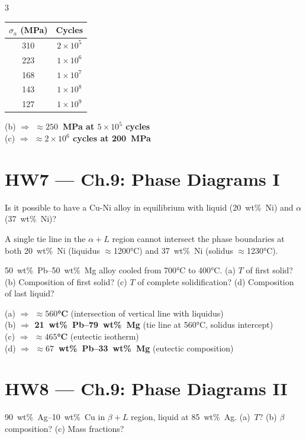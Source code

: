 \documentclass[8pt,letterpaper]{extarticle}
\newcommand{\prob}[1]{\smallskip\noindent{\footnotesize\bfseries\color{black!80} #1\quad}}
\newcommand{\soln}{\noindent{\footnotesize\itshape\color{blue!50!black}Sol: }}
\newcommand{\ans}[1]{{\footnotesize\bfseries\color{green!40!black}$\Rightarrow$ #1}}
\begin{document}
\begin{multicols*}{3}
\begin{center}
\footnotesize
\begin{tabular}{@{}cc@{}}
\toprule
$\sigma_a$ (MPa) & Cycles\\
\midrule
310 & $2\times10^5$\\
223 & $1\times10^6$\\
168 & $1\times10^7$\\
143 & $1\times10^8$\\
127 & $1\times10^9$\\
\bottomrule
\end{tabular}
\end{center}
(b) \ans{$\approx250$~MPa at $5\times10^5$ cycles}\\
(c) \ans{$\approx2\times10^6$ cycles at 200~MPa}

\section*{HW7 — Ch.9: Phase Diagrams I}

\prob{9.11} Is it possible to have a Cu-Ni alloy in equilibrium with liquid (20~wt\%~Ni) and $\alpha$ (37~wt\%~Ni)?

\soln \ans{No.} A single tie line in the $\alpha+L$ region cannot intersect the phase boundaries at both 20~wt\%~Ni (liquidus $\approx$1200°C) and 37~wt\%~Ni (solidus $\approx$1230°C).

\prob{9.14} 50~wt\%~Pb–50~wt\%~Mg alloy cooled from 700°C to 400°C. (a) $T$ of first solid? (b) Composition of first solid? (c) $T$ of complete solidification? (d) Composition of last liquid?

\soln (a) \ans{$\approx560$°C} (intersection of vertical line with liquidus)\\
(b) \ans{21~wt\%~Pb--79~wt\%~Mg} (tie line at 560°C, solidus intercept)\\
(c) \ans{$\approx465$°C} (eutectic isotherm)\\
(d) \ans{$\approx67$~wt\%~Pb--33~wt\%~Mg} (eutectic composition)

\section*{HW8 — Ch.9: Phase Diagrams II}

\prob{9.19} 90~wt\%~Ag–10~wt\%~Cu in $\beta+L$ region, liquid at 85~wt\%~Ag. (a)~$T$? (b) $\beta$ composition? (c) Mass fractions?


\end{multicols*}
\end{document}
